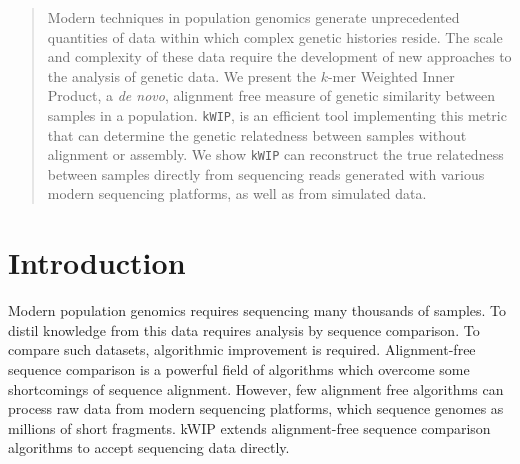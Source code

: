 \documentclass[a0,portrait]{a0poster}
\begin{document}
\begin{multicols}{2}


\begin{abstract}
\vspace{5mm}

Modern techniques in population genomics generate unprecedented quantities of
data within which complex genetic histories reside. The scale and complexity of
these data require the development of new approaches to the analysis of genetic
data. We present the $k$-mer Weighted Inner Product, a \textit{de novo},
alignment free measure of genetic similarity between samples in a population.
\texttt{kWIP}, is an efficient tool implementing this metric that can determine
the genetic relatedness between samples without alignment or assembly. We show
\texttt{kWIP} can reconstruct the true relatedness between samples directly
from sequencing reads generated with various modern sequencing platforms, as
well as from simulated data.

\end{abstract}


\section*{Introduction}

Modern population genomics requires sequencing many thousands of samples. To
distil knowledge from this data requires analysis by sequence comparison. To
compare such datasets, algorithmic improvement is required. Alignment-free
sequence comparison is a powerful field of algorithms which overcome some
shortcomings of sequence alignment. However, few alignment free algorithms can
process raw data from modern sequencing platforms, which sequence genomes as
millions of short fragments. kWIP extends alignment-free sequence comparison
algorithms to accept sequencing data directly.



\end{multicols}
\end{document}
